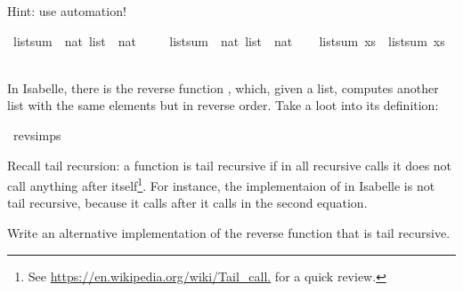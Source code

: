 \begin{isabellebody}
\begin{isamarkuptext}
  Hint: use automation!%
\end{isamarkuptext}\isamarkuptrue%
\isamarkupfalse%
\ list{\isacharunderscore}{\kern0pt}sum\ {\isacharcolon}{\kern0pt}{\isacharcolon}{\kern0pt}\ {\isachardoublequoteopen}nat\ list\ {\isasymRightarrow}\ nat{\isachardoublequoteclose}\ \isanewline
\ \ \isanewline
\isanewline
\isanewline
{}\isamarkupfalse%
\ list{\isacharunderscore}{\kern0pt}sum{\isacharprime}{\kern0pt}\ {\isacharcolon}{\kern0pt}{\isacharcolon}{\kern0pt}\ {\isachardoublequoteopen}nat\ list\ {\isasymRightarrow}\ nat{\isachardoublequoteclose}\isanewline
\ \ %
\isadelimproof
%
\endisadelimproof
%
\isatagproof
%
\endisatagproof
{\isafoldproof}%
%
\isadelimproof
%
\endisadelimproof
%
\isadelimproof
%
\endisadelimproof
%
\isatagproof
%
\endisatagproof
{\isafoldproof}%
%
\isadelimproof
%
\endisadelimproof
%
\isadelimproof
%
\endisadelimproof
%
\isatagproof
%
\endisatagproof
{\isafoldproof}%
%
\isadelimproof
\isanewline
%
\endisadelimproof
{}\isamarkupfalse%
\ {\isachardoublequoteopen}list{\isacharunderscore}{\kern0pt}sum\ xs\ {\isacharequal}{\kern0pt}\ list{\isacharunderscore}{\kern0pt}sum{\isacharprime}{\kern0pt}\ xs{\isachardoublequoteclose}\isanewline
\ \ %
\isadelimproof
%
\endisadelimproof
%
\isatagproof
%
\endisatagproof
{\isafoldproof}%
%
\isadelimproof
%
\endisadelimproof
%
\begin{isamarkuptext}%
In Isabelle, there is the reverse function , which, given a list, computes another list
with the same elements but in reverse order.
Take a loot into its definition:%
\end{isamarkuptext}\isamarkuptrue%
\isamarkupfalse%
\ rev{\isachardot}{\kern0pt}simps%
\begin{isamarkuptext}%
Recall tail recursion: a function is tail recursive if in all recursive calls it does not call 
  anything after itself\footnote{See \url{https://en.wikipedia.org/wiki/Tail_call.} for a quick review.}.
  For instance, the implementaion of  in Isabelle is not tail recursive, because it calls
  \isa{{\isacharparenleft}{\kern0pt}{\isacharat}{\kern0pt}{\isacharparenright}{\kern0pt}} after it calls  in the second equation.
  
  Write an alternative implementation of the reverse function that is tail recursive.


\end{isamarkuptext}
\end{isabellebody}
